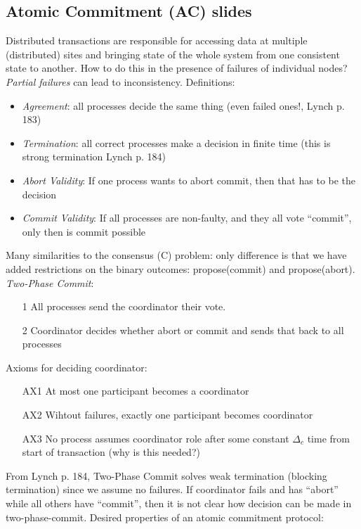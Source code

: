 \documentclass[a4paper,10pt,]{article}
\begin{document}
\subsection{Atomic Commitment (AC) slides}
Distributed transactions are responsible for accessing data at multiple (distributed) sites and bringing state of the whole system from one consistent state to another.  How to do this in the presence of failures of individual nodes?  \emph{Partial failures} can lead to inconsistency.
Definitions:
\begin{itemize}
  \item \emph{Agreement}: all processes decide the same thing (even failed ones!, Lynch p. 183)
  \item \emph{Termination}: all correct processes make a decision in finite time (this is strong termination Lynch p. 184)
  \item \emph{Abort Validity}: If one process wants to abort commit, then that has to be the decision
  \item \emph{Commit Validity}: If all processes are non-faulty, and they all vote ``commit'', only then is commit possible
\end{itemize}
Many similarities to the consensus (C) problem: only difference is that we have added restrictions on the binary outcomes: propose(commit) and propose(abort). \\
\emph{Two-Phase Commit}:
\begin{itemize}
  \item[1] All processes send the coordinator their vote.
  \item[2] Coordinator decides whether abort or commit and sends that back to all processes
\end{itemize}
Axioms for deciding coordinator:
\begin{itemize}
  \item[AX1] At most one participant becomes a coordinator
  \item[AX2] Wihtout failures, exactly one participant becomes coordinator
  \item[AX3] No process assumes coordinator role after some constant $\Delta_c$ time from start of transaction (why is this needed?)
\end{itemize}
From Lynch p. 184, Two-Phase Commit solves weak termination (blocking termination) since we assume no failures.  If coordinator fails and has ``abort'' while all others have ``commit'', then it is not clear how decision can be made in two-phase-commit.
Desired properties of an atomic commitment protocol:
\end{document}
